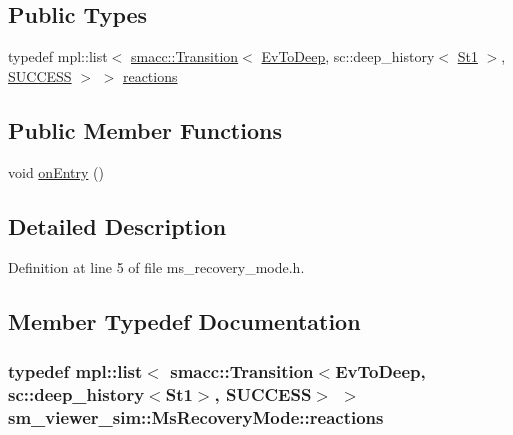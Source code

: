 \subsection*{Public Types}
\begin{DoxyCompactItemize}
\item 
typedef mpl\+::list$<$ \hyperlink{classsmacc_1_1Transition}{smacc\+::\+Transition}$<$ \hyperlink{structsm__viewer__sim_1_1EvToDeep}{Ev\+To\+Deep}, sc\+::deep\+\_\+history$<$ \hyperlink{structsm__viewer__sim_1_1St1}{St1} $>$, \hyperlink{structsmacc_1_1default__transition__tags_1_1SUCCESS}{S\+U\+C\+C\+E\+SS} $>$ $>$ \hyperlink{structsm__viewer__sim_1_1MsRecoveryMode_ab7097e3221f2536569663f5029730645}{reactions}
\end{DoxyCompactItemize}
\subsection*{Public Member Functions}
\begin{DoxyCompactItemize}
\item 
void \hyperlink{structsm__viewer__sim_1_1MsRecoveryMode_ab436ff9e90b963a3339644c0baf223d7}{on\+Entry} ()
\end{DoxyCompactItemize}


\subsection{Detailed Description}


Definition at line 5 of file ms\+\_\+recovery\+\_\+mode.\+h.



\subsection{Member Typedef Documentation}
\subsubsection[{\texorpdfstring{reactions}{reactions}}]{\setlength{\rightskip}{0pt plus 5cm}typedef mpl\+::list$<$ {\bf smacc\+::\+Transition}$<${\bf Ev\+To\+Deep}, sc\+::deep\+\_\+history$<${\bf St1}$>$, {\bf S\+U\+C\+C\+E\+SS}$>$ $>$ {\bf sm\+\_\+viewer\+\_\+sim\+::\+Ms\+Recovery\+Mode\+::reactions}}\hypertarget{structsm__viewer__sim_1_1MsRecoveryMode_ab7097e3221f2536569663f5029730645}{}\label{structsm__viewer__sim_1_1MsRecoveryMode_ab7097e3221f2536569663f5029730645}


